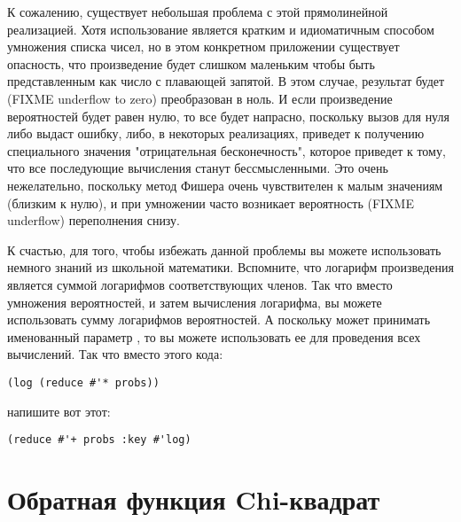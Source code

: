 К сожалению, существует небольшая проблема с этой прямолинейной реализацией.  Хотя
использование  является кратким и идиоматичным способом умножения списка
чисел, но в этом конкретном приложении существует опасность, что произведение будет
слишком маленьким чтобы быть представленным как число с плавающей запятой. В этом случае,
результат будет (FIXME underflow to zero) преобразован в ноль.  И если произведение
вероятностей будет равен нулю, то все будет напрасно, поскольку вызов  для нуля
либо выдаст ошибку, либо, в некоторых реализациях, приведет к получению специального
значения "отрицательная бесконечность", которое приведет к тому, что все последующие
вычисления станут бессмысленными.  Это очень нежелательно, поскольку метод Фишера очень
чувствителен к малым значениям (близким к нулю), и при умножении часто возникает
вероятность (FIXME underflow) переполнения снизу.

К счастью, для того, чтобы избежать данной проблемы вы можете использовать немного знаний
из школьной математики.  Вспомните, что логарифм произведения является суммой логарифмов
соответствующих членов.  Так что вместо умножения вероятностей, и затем вычисления
логарифма, вы можете использовать сумму логарифмов вероятностей.  А поскольку
 может принимать именованный параметр , то вы можете использовать
ее для проведения всех вычислений.  Так что вместо этого кода:

\begin{lstlisting}
(log (reduce #'* probs))
\end{lstlisting}

напишите вот этот:

\begin{lstlisting}
(reduce #'+ probs :key #'log)
\end{lstlisting}

\section{Обратная функция Chi-квадрат}


